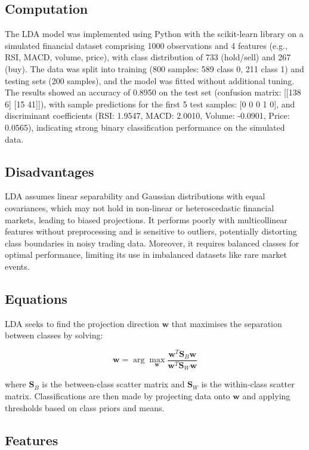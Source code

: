 \documentclass{article}
\begin{document}
\subsection{Computation}

The LDA model was implemented using Python with the scikit-learn library on a simulated financial dataset comprising 1000 observations and 4 features (e.g., RSI, MACD, volume, price), with class distribution of 733 (hold/sell) and 267 (buy). The data was split into training (800 samples: 589 class 0, 211 class 1) and testing sets (200 samples), and the model was fitted without additional tuning. The results showed an accuracy of 0.8950 on the test set (confusion matrix: [[138 6] [15 41]]), with sample predictions for the first 5 test samples: [0 0 0 1 0], and discriminant coefficients (RSI: 1.9547, MACD: 2.0010, Volume: -0.0901, Price: 0.0565), indicating strong binary classification performance on the simulated data.

\subsection{Disadvantages}

LDA assumes linear separability and Gaussian distributions with equal covariances, which may not hold in non-linear or heteroscedastic financial markets, leading to biased projections. It performs poorly with multicollinear features without preprocessing and is sensitive to outliers, potentially distorting class boundaries in noisy trading data. Moreover, it requires balanced classes for optimal performance, limiting its use in imbalanced datasets like rare market events.

\subsection{Equations}

LDA seeks to find the projection direction $\mathbf{w}$ that maximises the separation between classes by solving:

\[
\mathbf{w} = \arg\max_{\mathbf{w}} \frac{\mathbf{w}^T \mathbf{S}_B \mathbf{w}}{\mathbf{w}^T \mathbf{S}_W \mathbf{w}}
\]

where $\mathbf{S}_B$ is the between-class scatter matrix and $\mathbf{S}_W$ is the within-class scatter matrix. Classifications are then made by projecting data onto $\mathbf{w}$ and applying thresholds based on class priors and means.

\subsection{Features}
\end{document}
